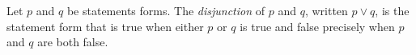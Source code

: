 \guard





\begin{defn}
\label{defn:disjunctionOfStatement}
  Let $p$ and $q$ be statements forms.
  The \emph{disjunction} of $p$ and $q$, written $p \vee q$, is the statement form that is true when either $p$ or $q$ is true and false precisely when $p$ and $q$ are both false.
\end{defn}
